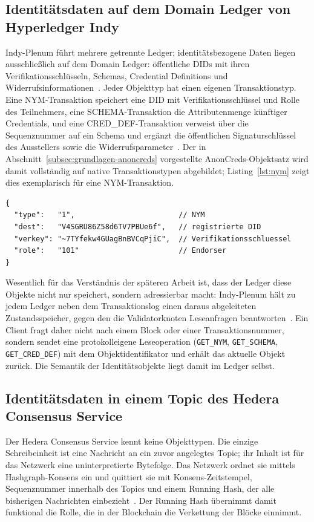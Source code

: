 \subsection{Identitätsdaten auf dem Domain Ledger von Hyperledger Indy}
\label{subsec:grundlagen-speicher-indy}

Indy-Plenum führt mehrere getrennte Ledger; identitätsbezogene Daten liegen ausschließlich auf dem Domain Ledger: öffentliche DIDs mit ihren Verifikationsschlüsseln, Schemas, Credential Definitions und Widerrufsinformationen~\cite{torongo2023}. Jeder Objekttyp hat einen eigenen Transaktionstyp. Eine NYM-Transaktion speichert eine DID mit Verifikationsschlüssel und Rolle des Teilnehmers, eine SCHEMA-Transaktion die Attributenmenge künftiger Credentials, und eine CRED\_DEF-Transaktion verweist über die Sequenznummer auf ein Schema und ergänzt die öffentlichen Signaturschlüssel des Ausstellers sowie die Widerrufsparameter~\cite{indynode}. Der in Abschnitt~\ref{subsec:grundlagen-anoncreds} vorgestellte AnonCreds-Objektsatz wird damit vollständig auf native Transaktionstypen abgebildet; Listing~\ref{lst:nym} zeigt dies exemplarisch für eine NYM-Transaktion.

\begin{lstlisting}[basicstyle=\ttfamily\footnotesize, frame=single, caption={Inhalt einer NYM-Transaktion (vereinfacht)}, label={lst:nym}]
{
  "type":   "1",                        // NYM
  "dest":   "V4SGRU86Z58d6TV7PBUe6f",   // registrierte DID
  "verkey": "~7TYfekw4GUagBnBVCqPjiC",  // Verifikationsschluessel
  "role":   "101"                       // Endorser
}
\end{lstlisting}

Wesentlich für das Verständnis der späteren Arbeit ist, dass der Ledger diese Objekte nicht nur speichert, sondern adressierbar macht: Indy-Plenum hält zu jedem Ledger neben dem Transaktionslog einen daraus abgeleiteten Zustandsspeicher, gegen den die Validatorknoten Leseanfragen beantworten~\cite{indynode}. Ein Client fragt daher nicht nach einem Block oder einer Transaktionsnummer, sondern sendet eine protokolleigene Leseoperation (\texttt{GET\_NYM}, \texttt{GET\_SCHEMA}, \texttt{GET\_CRED\_DEF}) mit dem Objektidentifikator und erhält das aktuelle Objekt zurück. Die Semantik der Identitätsobjekte liegt damit im Ledger selbst.


\subsection{Identitätsdaten in einem Topic des Hedera Consensus Service}
\label{subsec:grundlagen-speicher-hcs}
Der Hedera Consensus Service kennt keine Objekttypen. Die einzige Schreibeinheit ist eine Nachricht an ein zuvor angelegtes Topic; ihr Inhalt ist für das Netzwerk eine uninterpretierte Bytefolge. Das Netzwerk ordnet sie mittels Hashgraph-Konsens ein und quittiert sie mit Konsens-Zeitstempel, Sequenznummer innerhalb des Topics und einem Running Hash, der alle bisherigen Nachrichten einbezieht~\cite{bairdgross2019, hederasubmitmessage}. Der Running Hash übernimmt damit funktional die Rolle, die in der Blockchain die Verkettung der Blöcke einnimmt.

